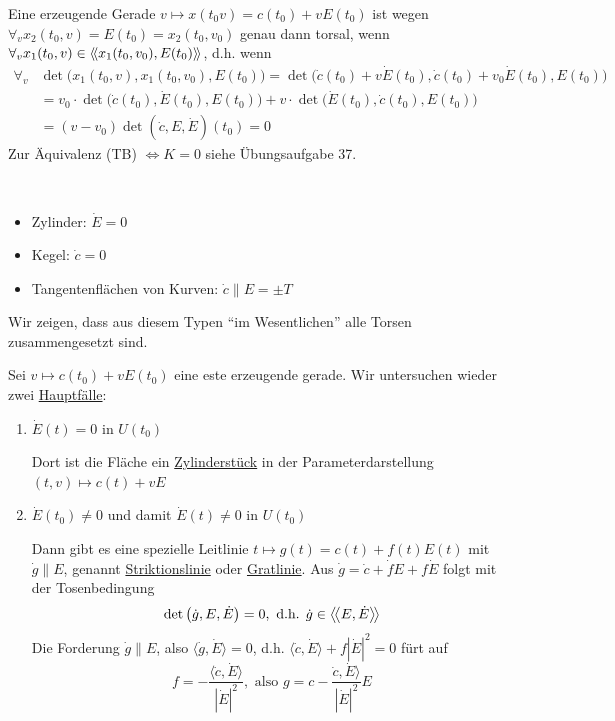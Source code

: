 \begin{beweis}
 Eine erzeugende Gerade \(v \mapsto x(t_0 v) = c(t_0) + v E(t_0)\) ist wegen \(\forall_v x_2(t_0, v) = E(t_0) = x_2(t_0, v_0)\) genau dann torsal, wenn \(\forall_v x_1(t_0, v) \in \left\langle\!\left\langle x_1(t_0, v_0), E(t_0) \right\rangle\!\right\rangle\), d.h. wenn 
 \begin{align*}
  \forall_v &\det\big(x_1(t_0, v), x_1(t_0, v_0), E(t_0)\big) = \det \big(\dot c(t_0) + v \dot E(t_0), \dot c(t_0) + v_0 \dot E(t_0), E(t_0)\big) \\
  &= v_0 \cdot \det \big(\dot c(t_0), \dot E(t_0), E(t_0)\big) + v \cdot \det \big(\dot E(t_0), \dot c(t_0), E(t_0)\big) \\
  &= (v - v_0) \det \left(\dot c, E, \dot E\right) (t_0) = 0
 \end{align*}
 Zur Äquivalenz (TB) \(\Leftrightarrow K = 0\) siehe Übungsaufgabe 37.
\end{beweis}

\begin{bsp} \(\)
 \begin{itemize}
  \item Zylinder: \(\dot E = 0\)
  \item Kegel: \(\dot c = 0\)
  \item Tangentenflächen von Kurven: \(\dot c \parallel E = \pm T\)
 \end{itemize}
\end{bsp}

Wir zeigen, dass aus diesem Typen ``im Wesentlichen'' alle Torsen zusammengesetzt sind. \par
Sei \(v \mapsto c(t_0) + v E(t_0)\) eine este erzeugende gerade. Wir untersuchen wieder zwei \uline{Hauptfälle}:
\begin{enumerate}
 \item[{\color{green}(A)}] \(\dot E(t) = 0\) in \(U(t_0)\) \par
 Dort ist die Fläche ein \uline{Zylinderstück} in der Parameterdarstellung \((t,v) \mapsto c(t) + v E\)
 \item[{\color{green}(B)}] \(\dot E(t_0) \ne 0\) und damit \(\dot E(t) \ne 0\) in \(U(t_0)\) \par
 Dann gibt es eine spezielle Leitlinie \(t \mapsto g(t) = c(t) + f(t) E(t)\) mit \(\dot g \parallel E\), genannt \uline{Striktionslinie} oder \uline{Gratlinie}. Aus \(\dot g = \dot c + \dot f E + f \dot E\) folgt mit der Tosenbedingung
 \[
  \det \left(\dot g, E, \dot E\right) = 0, \text{ d.h. } \dot g \in \left\langle\!\left\langle E, \dot E\right\rangle\!\right\rangle
 \]
 Die Forderung \(\dot g \parallel E\), also \(\langle \dot g, \dot E\rangle = 0\), d.h. \(\langle \dot c, \dot E\rangle + f \left| \dot E \right|^2 = 0\) fürt auf
 \[
  f = - \frac{\langle \dot c, \dot E\rangle}{\left|\dot E\right|^2}, \text{ also } g = c - \frac{\dot c, \dot E\rangle}{\left|\dot E\right|^2}E
 \]
\end{enumerate}

